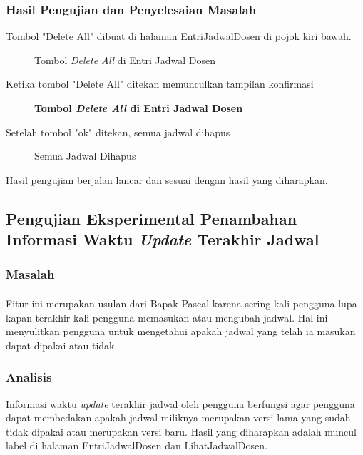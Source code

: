 \subsubsection{Hasil Pengujian dan Penyelesaian Masalah}
Tombol "Delete All" dibuat di halaman EntriJadwalDosen di pojok kiri bawah.
\begin{figure} [H]
	\centering  
	\caption[Tombol \textit{Delete All} di Entri Jadwal Dosen]{Tombol \textit{Delete All} di Entri Jadwal Dosen} 
	\label{fig:flow-chart-CodeIgniter} 
\end{figure}
Ketika tombol "Delete All" ditekan memunculkan tampilan konfirmasi
\begin{figure} [H]
	\centering  
	\caption[Tampilan Konfirmasi]{\textbf{Tombol \textit{Delete All} di Entri Jadwal Dosen}} 
	\label{fig:flow-chart-CodeIgniter} 
\end{figure}
Setelah tombol "ok" ditekan, semua jadwal dihapus
\begin{figure} [H]
	\centering  
	\caption[Semua Jadwal Dihapus]{Semua Jadwal Dihapus} 
	\label{fig:flow-chart-CodeIgniter} 
\end{figure}
Hasil pengujian berjalan lancar dan sesuai dengan hasil yang diharapkan.

\subsection{Pengujian Eksperimental Penambahan Informasi Waktu \textit{Update} Terakhir Jadwal}
\subsubsection{Masalah}
\paragraph{}Fitur ini merupakan usulan dari Bapak Pascal karena sering kali pengguna lupa kapan terakhir kali pengguna memasukan atau mengubah jadwal. Hal ini menyulitkan pengguna untuk mengetahui apakah jadwal yang telah ia masukan dapat dipakai atau tidak.
\subsubsection{Analisis}
Informasi waktu \textit{update} terakhir jadwal oleh pengguna berfungsi agar pengguna dapat membedakan apakah jadwal miliknya merupakan versi lama yang sudah tidak dipakai atau merupakan versi baru. Hasil yang diharapkan adalah muncul label di halaman EntriJadwalDosen dan LihatJadwalDosen.
